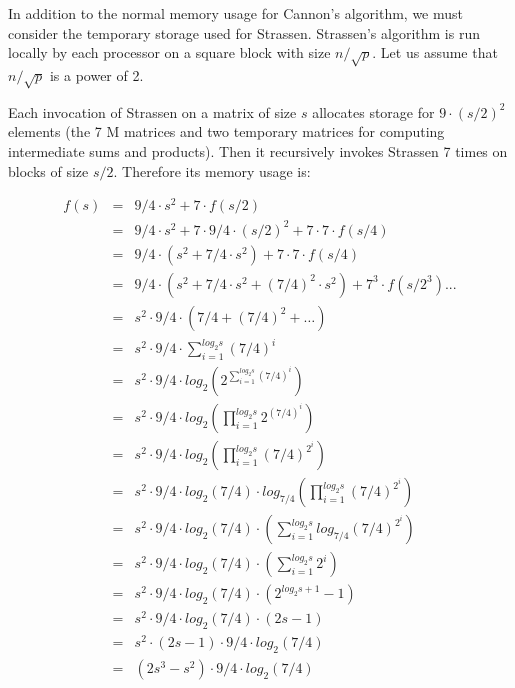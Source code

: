 \documentclass{article}
\begin{document}
In addition to the normal memory usage for Cannon's algorithm, we must consider
the temporary storage used for Strassen. Strassen's algorithm is run locally by
each processor on a square block with size $n/\sqrt{p}$. Let us assume that
$n/\sqrt{p}$ is a power of 2.

Each invocation of Strassen on a matrix of size $s$ allocates storage for
$9 \cdot (s/2)^2$ elements (the 7 M matrices and two temporary matrices for computing
intermediate sums and products). Then it recursively invokes Strassen 7 times on
blocks of size $s/2$. Therefore its memory usage is:

\begin{eqnarray*}
f(s) &=& 9/4\cdot s^2 + 7\cdot f(s/2)	\\
&=& 9/4\cdot  s^2 + 7\cdot  9/4\cdot  (s/2)^2 + 7\cdot  7\cdot  f(s/4)	\\
&=& 9/4\cdot  (s^2 + 7/4\cdot  s^2) + 7\cdot  7\cdot  f(s/4)	\\
&=& 9/4\cdot  ( s^2 + 7/4\cdot  s^2 + (7/4)^2\cdot  s^2 ) +7^3\cdot  f(s/2^3) ... 	\\
&=& s^2 \cdot   9/4 \cdot   (7/4 + (7/4)^2 + \dots)	\\
&=& s^2 \cdot   9/4 \cdot   \sum\limits_{i=1}^{log_2 s} (7/4)^i 	\\
&=& s^2 \cdot   9/4 \cdot   log_2\left(2^{\sum\limits_{i=1}^{log_2 s} (7/4)^i}\right) 	\\
&=& s^2 \cdot   9/4 \cdot   log_2\left(\prod\limits_{i=1}^{log_2 s} 2^{(7/4)^i}\right) 	\\
&=& s^2 \cdot   9/4 \cdot   log_2\left(\prod\limits_{i=1}^{log_2 s} (7/4)^{2^i}\right) 	\\
&=& s^2 \cdot   9/4 \cdot   log_2(7/4) \cdot   log_{7/4}\left(\prod\limits_{i=1}^{log_2 s} (7/4)^{2^i}\right) 	\\
&=& s^2 \cdot   9/4 \cdot   log_2(7/4) \cdot   \left(\sum\limits_{i=1}^{log_2 s} log_{7/4}(7/4)^{2^i}\right) 	\\
&=& s^2 \cdot   9/4 \cdot   log_2(7/4) \cdot   \left(\sum\limits_{i=1}^{log_2 s} 2^i\right) 	\\
&=& s^2 \cdot   9/4 \cdot   log_2(7/4) \cdot   (2^{log_2 s+1} - 1) 	\\
&=& s^2 \cdot   9/4 \cdot   log_2(7/4) \cdot   (2 s - 1) 	\\
&=& s^2 \cdot   (2  s - 1) \cdot   9/4 \cdot   log_2(7/4) 	\\
&=& (2  s^3 - s^2) \cdot   9/4 \cdot   log_2(7/4)
\end{eqnarray*}
\end{document}
